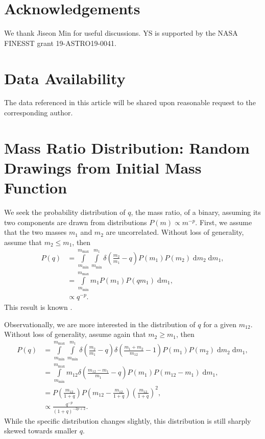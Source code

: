 \documentclass[
        fleqn,
        usenatbib,
    ]{mnras}
\newcommand*{\p}[1]{\left(#1\right)}
\begin{document}
\section{Acknowledgements}\label{s:ack}

We thank Jiseon Min for useful discussions. YS is supported by the NASA FINESST
grant 19-ASTRO19-0041.%

\section{Data Availability}

The data referenced in this article will be shared upon reasonable request to
the corresponding author.




\clearpage
\onecolumn

\appendix

\section{Mass Ratio Distribution: Random Drawings from Initial Mass
Function}\label{s:ratios}

We seek the probability distribution of $q$, the mass ratio, of a binary,
assuming its two components are drawn from distributions $P(m) \propto m^{-p}$.
First, we assume that the two masses $m_1$ and $m_2$ are uncorrelated. Without
loss of generality, assume that $m_2 \leq m_1$, then
\begin{align}
    P(q) &= \int\limits_{m_{\min}}^{m_{\max}}\int\limits_{m_{\min}}^{m_1}
            \delta\p{\frac{m_2}{m_1} - q}P(m_1) P(m_2)
            \;\mathrm{d}m_2\;\mathrm{d}m_1,\\
        &= \int\limits_{m_{\min}}^{m_{\max}} m_1 P(m_1) P(qm_1)
            \;\mathrm{d}m_1,\\
        &\propto q^{-p}.
\end{align}
This result is known \citep[e.g.][]{moe2017mind}.

Observationally, we are more interested in the distribution of $q$ for a given
$m_{12}$. Without loss of generality, assume again that $m_2 \geq m_1$, then
\begin{align}
    P(q) &= \int\limits_{m_{\min}}^{m_{\max}}
            \int\limits_{m_{\min}}^{m_1}
            \delta\p{\frac{m_2}{m_1} - q}
            \delta\p{\frac{m_1 + m_2}{m_{12}} - 1}
            P(m_1)
            P\p{m_2}\;\mathrm{d}m_2\;\mathrm{d}m_1,\\
        &= \int\limits_{m_{\min}}^{m_{\max}}
            m_{12}\delta\p{\frac{m_{12} - m_1}{m_1} - q}
            P(m_1)
            P\p{m_{12} - m_1}\;\mathrm{d}m_1,\\
        &= P\p{\frac{m_{12}}{1 + q}}P\p{m_{12} - \frac{m_{12}}{1 + q}}
            \p{\frac{m_{12}}{1 + q}}^2,\\
        &\propto \frac{q^{-p}}{\p{1 + q}^{-2p + 2}}.
\end{align}
While the specific distribution changes slightly, this distribution is still
sharply skewed towards smaller $q$.
\end{document}
